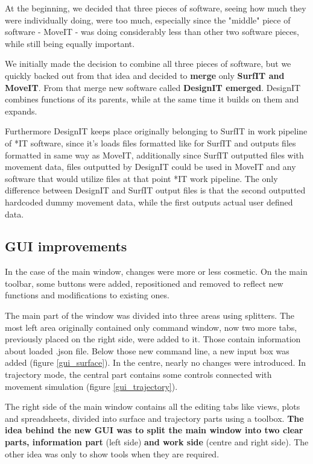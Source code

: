\documentclass[a4paper, 11pt, article]{report}
\begin{document}
At the beginning, we decided that three pieces of software, seeing how much they were individually doing, were too much, especially since the "middle" piece of software - MoveIT - was doing considerably less than other two software pieces, while still being equally important. 

We initially made the decision to combine all three pieces of software, but we quickly backed out from that idea and decided to \textbf{merge} only \textbf{SurfIT and MoveIT}. From that merge new software called \textbf{DesignIT emerged}. DesignIT combines functions of its parents, while at the same time it builds on them and expands. 

Furthermore DesignIT keeps place originally belonging to SurfIT in work pipeline of *IT software, since it's loads files formatted like for SurfIT and outputs files formatted in same way as MoveIT, additionally since SurfIT outputted files with movement data, files outputted by DesignIT could be used in MoveIT and any software that would utilize files at that point *IT work pipeline. The only difference between DesignIT and SurfIT output files is that the second outputted hardcoded dummy movement data, while the first outputs actual user defined data.

\subsection{GUI improvements}

In the case of the main window, changes were more or less cosmetic. On the main toolbar, some buttons were added, repositioned and removed to reflect new functions and modifications to existing ones. 

The main part of the window was divided into three areas using splitters. The most left area originally contained only command window, now two more tabs, previously placed on the right side, were added to it. Those contain information about loaded .json file. Below those new command line, a new input box was added (figure \ref{gui_surface}). In the centre, nearly no changes were introduced. In trajectory mode, the central part contains some controls connected with movement simulation (figure \ref{gui_trajectory}). 

The right side of the main window contains all the editing tabs like views, plots and spreadsheets, divided into surface and trajectory parts using a toolbox. \textbf{The idea behind the new GUI was to split the main window into two clear parts, information part} (left side) \textbf{and work side} (centre and right side). The other idea was only to show tools when they are required.
\end{document}
